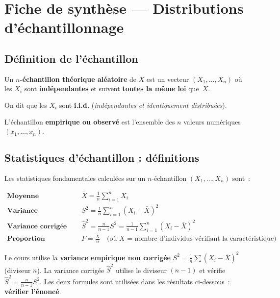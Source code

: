 \documentclass[11pt,a4paper]{article}
\begin{document}
\section{Fiche de synth\`ese --- Distributions d'\'echantillonnage}

\subsection{D\'efinition de l'\'echantillon}

\begin{defbox}[\'Echantillon i.i.d.]
Un \textbf{$n$-\'echantillon th\'eorique al\'eatoire} de $X$ est un vecteur $(X_1,\ldots,X_n)$ o\`u les $X_i$ sont \textbf{ind\'ependantes} et suivent \textbf{toutes la m\^eme loi} que~$X$.

On dit que les $X_i$ sont \textbf{i.i.d.} (\textit{ind\'ependantes et identiquement distribu\'ees}).

L'\'echantillon \textbf{empirique ou observ\'e} est l'ensemble des $n$ valeurs num\'eriques $(x_1,\ldots,x_n)$.
\end{defbox}

\subsection{Statistiques d'\'echantillon : d\'efinitions}

Les statistiques fondamentales calcul\'ees sur un $n$-\'echantillon $(X_1,\ldots,X_n)$ sont~:

\begin{defbox}
\begin{align*}
\textbf{Moyenne empirique} &\quad \bar{X} = \frac{1}{n}\sum_{i=1}^n X_i \\[6pt]
\textbf{Variance empirique} &\quad S^2 = \frac{1}{n}\sum_{i=1}^n (X_i - \bar{X})^2 \\[6pt]
\textbf{Variance corrig\'ee} &\quad \hat{S}^2 = \frac{n}{n-1}S^2 = \frac{1}{n-1}\sum_{i=1}^n (X_i - \bar{X})^2 \\[6pt]
\textbf{Proportion empirique} &\quad F = \frac{X}{n}
  \quad \text{(o\`u $X$ = nombre d'individus v\'erifiant la caract\'eristique)}
\end{align*}
\end{defbox}

\begin{alertbox}
Le cours utilise la \textbf{variance empirique non corrig\'ee} $S^2 = \frac{1}{n}\sum(X_i-\bar{X})^2$ (diviseur $n$). La variance corrig\'ee $\hat{S}^2$ utilise le diviseur $(n-1)$ et v\'erifie $\hat{S}^2 = \frac{n}{n-1}S^2$. Les deux formules sont utilis\'ees dans les r\'esultats ci-dessous~: \textbf{v\'erifier l'\'enonc\'e}.
\end{alertbox}
\end{document}
